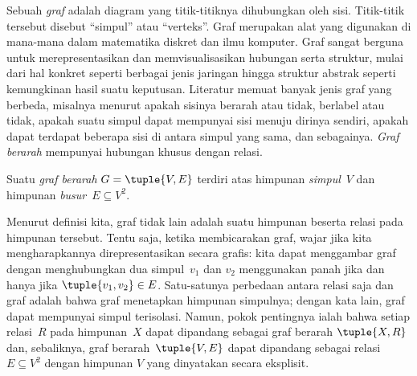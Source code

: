 \documentclass[../../../include/open-logic-section]{subfiles}
\begin{document}

Sebuah \emph{graf} adalah diagram yang titik-titiknya dihubungkan oleh sisi.
Titik-titik tersebut disebut ``simpul'' atau ``verteks''. Graf merupakan alat
yang digunakan di
mana-mana dalam matematika diskret dan ilmu komputer. Graf sangat berguna
untuk merepresentasikan dan memvisualisasikan hubungan serta struktur, mulai
dari hal konkret seperti berbagai jenis jaringan hingga struktur abstrak
seperti kemungkinan hasil suatu keputusan. Literatur memuat banyak jenis graf
yang berbeda, misalnya menurut apakah sisinya berarah atau tidak, berlabel atau
tidak, apakah suatu simpul dapat mempunyai sisi menuju dirinya sendiri, apakah
dapat terdapat beberapa sisi di antara simpul yang sama, dan sebagainya.
\emph{Graf berarah} mempunyai hubungan khusus dengan relasi.

\begin{defn}
Suatu \emph{graf berarah} $G = \tuple{V, E}$ terdiri atas himpunan
\emph{simpul}~$V$ dan himpunan \emph{busur}~$E \subseteq V^2$.
\end{defn}

\begin{explain}
Menurut definisi kita, graf tidak lain adalah suatu himpunan beserta relasi
pada himpunan tersebut. Tentu saja, ketika membicarakan graf, wajar jika kita
mengharapkannya direpresentasikan secara grafis: kita dapat menggambar graf
dengan menghubungkan dua simpul~$v_1$ dan $v_2$ menggunakan panah jika dan
hanya jika $\tuple{v_1, v_2} \in E$. Satu-satunya perbedaan antara relasi saja
dan graf adalah bahwa graf menetapkan himpunan simpulnya; dengan kata lain,
graf dapat mempunyai simpul terisolasi. Namun, pokok pentingnya ialah bahwa
setiap relasi~$R$ pada himpunan~$X$ dapat dipandang sebagai graf berarah
$\tuple{X, R}$ dan, sebaliknya, graf berarah~$\tuple{V, E}$ dapat dipandang
sebagai relasi $E \subseteq V^2$ dengan himpunan $V$ yang dinyatakan secara
eksplisit.
\end{explain}
\end{document}
